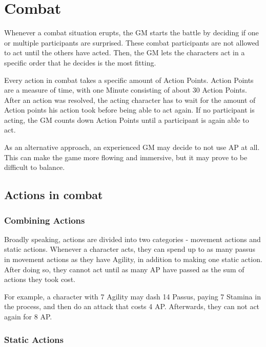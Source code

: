 
\chapter{Combat}
Whenever a combat situation erupts, the GM starts the battle by deciding if one or multiple participants are surprised. These combat participants are not allowed to act until the others have acted. Then, the GM lets the characters act in a specific order that he decides is the most fitting.

Every action in combat takes a specific amount of Action Points. Action Points are a measure of time, with one Minute consisting of about 30 Action Points. After an action was resolved, the acting character has to wait for the amount of Action points his action took before being able to act again. If no participant is acting, the GM counts down Action Points until a participant is again able to act.

As an alternative approach, an experienced GM may decide to not use AP at all. This can make the game more flowing and immersive, but it may prove to be difficult to balance.


\section{Actions in combat}

\subsection{Combining Actions}
Broadly speaking, actions are divided into two categories - movement actions and static actions. Whenever a character acts, they can spend up to as many passus in movement actions as they have Agility, in addition to making one static action. After doing so, they cannot act until as many AP have passed as the sum of actions they took cost.

For example, a character with 7 Agility may dash 14 Passus, paying 7 Stamina in the process, and then do an attack that costs 4 AP. Afterwards, they can not act again for 8 AP.

\subsection{Static Actions}

